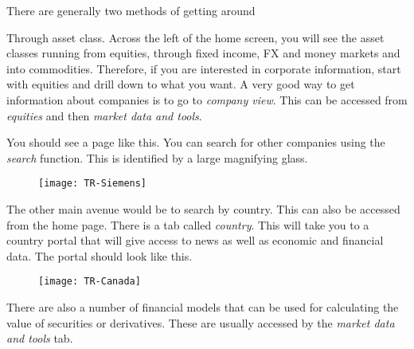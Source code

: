 \documentclass[12pt, a4paper, oneside]{article}\usepackage{graphicx, color}
\begin{document}
There are generally two methods of getting around

Through asset class.  Across the left of the home screen, you will see the asset classes running from equities, through fixed income, FX and money markets and into commodities.  Therefore, if you are interested in corporate information, start with equities and drill down to what you want.  A very good way to get information about companies is to go to \emph{company view}.  This can be accessed from \emph{equities} and then  \emph{market data and tools}. 

You should see a page like this.  You can search for other companies using the \emph{search} function.  This is identified by a large magnifying glass. 

\begin{figure}[h!]
\centering
\texttt{[image: TR-Siemens]}
\end{figure}

The other main avenue would be to search by country.  This can also be accessed from the home page.  There is a tab called \emph{country}.  This will take you to a country portal that will give access to news as well as economic and financial data.  The portal should look like this. 

\begin{figure}[h!]
\centering
\texttt{[image: TR-Canada]}
\end{figure}

There are also a number of financial models that can be used for calculating the value of securities or derivatives. These are usually accessed by the \emph{market data and tools} tab. 
\end{document}
